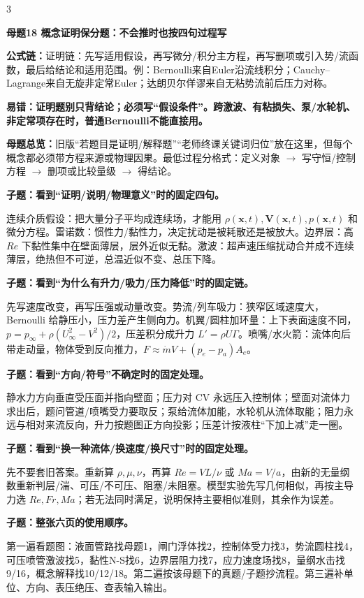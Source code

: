 \documentclass[a4paper]{article}
\newcommand{\mt}[1]{\vspace{0.12pt}\colorbox{M}{\parbox{\dimexpr\linewidth-2\fboxsep}{\color{white}\bfseries #1}}\par}
\newcommand{\qt}[1]{\vspace{0.04pt}\colorbox{Q}{\parbox{\dimexpr\linewidth-2\fboxsep}{\color{white}\bfseries #1}}\par}
\newcommand{\ans}[1]{\colorbox{G}{\parbox{\dimexpr\linewidth-2\fboxsep}{#1}}\par}
\newcommand{\warn}[1]{\colorbox{Y}{\parbox{\dimexpr\linewidth-2\fboxsep}{\color{E}\bfseries #1}}\par}
\newcommand{\form}[1]{{\color{M}\bfseries 公式链：}#1\par}
\newcommand{\mview}[1]{\ans{\textbf{母题总览：}#1}}
\begin{document}
\begin{multicols}{3}
\mt{母题18 概念证明保分题：不会推时也按四句过程写}
\form{证明链：先写适用假设，再写微分/积分主方程，再写删项或引入势/流函数，最后给结论和适用范围。例：Bernoulli来自Euler沿流线积分；Cauchy--Lagrange来自无旋非定常Euler；达朗贝尔佯谬来自无粘势流前后压力对称。}
\warn{易错：证明题别只背结论；必须写“假设条件”。跨激波、有粘损失、泵/水轮机、非定常项存在时，普通Bernoulli不能直接用。}
\mview{旧版“若题目是证明/解释题”“老师终课关键词归位”放在这里，但每个概念都必须带方程来源或物理因果。最低过程分格式：定义对象 $\to$ 写守恒/控制方程 $\to$ 删项或比较量级 $\to$ 得结论。}
\qt{子题：看到“证明/说明/物理意义”时的固定四句。}
\ans{连续介质假设：把大量分子平均成连续场，才能用 $\rho(\bm x,t),\bm V(\bm x,t),p(\bm x,t)$ 和微分方程。雷诺数：惯性力/黏性力，决定扰动是被耗散还是被放大。边界层：高 $Re$ 下黏性集中在壁面薄层，层外近似无黏。激波：超声速压缩扰动合并成不连续薄层，绝热但不可逆，总温近似不变、总压下降。}
\qt{子题：看到“为什么有升力/吸力/压力降低”时的固定链。}
\ans{先写速度改变，再写压强或动量改变。势流/列车吸力：狭窄区域速度大，Bernoulli 给静压小，压力差产生侧向力。机翼/圆柱加环量：上下表面速度不同，$p=p_\infty+\rho(U_\infty^2-V^2)/2$，压差积分成升力 $L'=\rho U\Gamma$。喷嘴/水火箭：流体向后带走动量，物体受到反向推力，$F\approx\dot mV+(p_e-p_a)A_e$。}
\qt{子题：看到“方向/符号”不确定时的固定处理。}
\ans{静水力方向垂直受压面并指向壁面；压力对 CV 永远压入控制体；壁面对流体力求出后，题问管道/喷嘴受力要取反；泵给流体加能，水轮机从流体取能；阻力永远与相对来流反向，升力按题图正方向投影；压差计按液柱“下加上减”走一圈。}
\qt{子题：看到“换一种流体/换速度/换尺寸”时的固定处理。}
\ans{先不要套旧答案。重新算 $\rho,\mu,\nu$，再算 $Re=VL/\nu$ 或 $Ma=V/a$，由新的无量纲数重新判层/湍、可压/不可压、阻塞/未阻塞。模型实验先写几何相似，再按主导力选 $Re,Fr,Ma$；若无法同时满足，说明保持主要相似准则，其余作为误差。}
\qt{子题：整张六页的使用顺序。}
\ans{第一遍看题图：液面管路找母题1，闸门浮体找2，控制体受力找3，势流圆柱找4，可压喷管激波找5，黏性N-S找6，边界层阻力找7，应力速度场找8，量纲水击找9/16，概念解释找10/12/18。第二遍按该母题下的真题/子题抄流程。第三遍补单位、方向、表压绝压、查表输入输出。}


\end{multicols}
\end{document}
